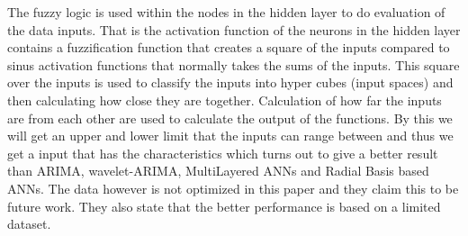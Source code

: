 The fuzzy logic is used within the nodes in the hidden layer to do evaluation of the data inputs. That is the activation function of the neurons in the hidden layer contains a fuzzification function that creates a square of the inputs compared to sinus activation functions that normally takes the sums of the inputs. This square over the inputs is used to classify the inputs into hyper cubes (input spaces) and then calculating how close they are together. Calculation of how far the inputs are from each other are used to calculate the output of the functions. By this we will get an upper and lower limit that the inputs can range between and thus we get a input that has the characteristics which turns out to give a better result than ARIMA, wavelet-ARIMA, MultiLayered ANNs and Radial Basis based ANNs. The data however is not optimized in this paper and they claim this to be future work. They also state that the better performance is based on a limited dataset.